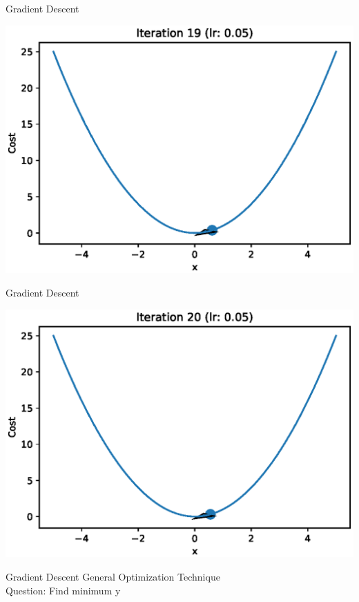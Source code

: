 \documentclass{beamer}
\begin{document}
	\begin{frame}{Gradient Descent}
		\begin{center}
			\includegraphics[totalheight=6cm]{gradient-descent/iteration-19.eps}
		\end{center}
	\end{frame}
	
	\begin{frame}{Gradient Descent}
		\begin{center}
			\includegraphics[totalheight=6cm]{gradient-descent/iteration-20.eps}
		\end{center}
	\end{frame}
	
	
	
	\begin{frame}{Gradient Descent}
		General Optimization Technique\\
		Question: Find minimum y
	\end{frame}
	
\end{document}
